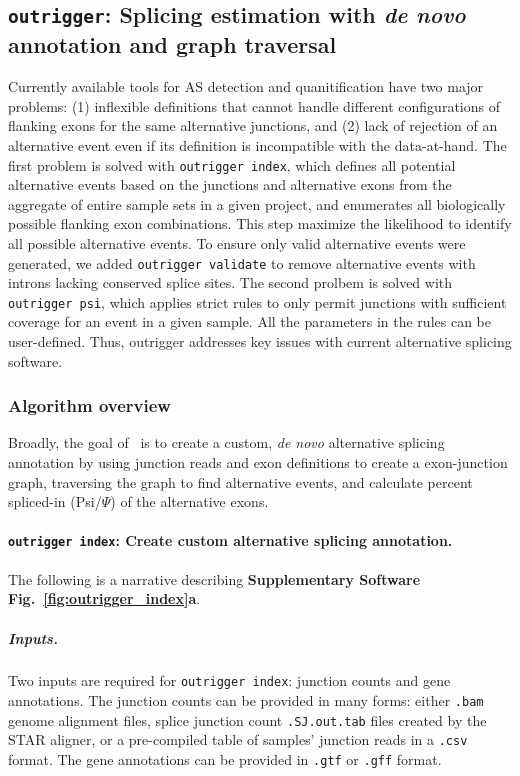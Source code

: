 \subsection{\texttt{outrigger}: Splicing estimation with \emph{de novo} annotation and graph traversal}
\label{sec:outrigger}

Currently available tools for AS detection and quanitification have two major problems: (1) inflexible definitions that cannot handle different configurations of flanking exons for the same alternative junctions, and (2) lack of rejection of an alternative event even if its definition is incompatible with the data-at-hand. The first problem is solved with \texttt{outrigger index}, which defines all potential alternative events based on the junctions and alternative exons from the aggregate of entire sample sets in a given project, and enumerates all biologically possible flanking exon combinations. This step maximize the likelihood to identify all possible alternative events. To ensure only valid alternative events were generated, we added \texttt{outrigger validate} to remove alternative events with introns lacking conserved splice sites. The second prolbem is solved with \texttt{outrigger psi}, which applies strict rules to only permit junctions with sufficient coverage for an event in a given sample. All the parameters in the rules can be user-defined. Thus, outrigger addresses key issues with current alternative splicing software.

\subsubsection{Algorithm overview}




Broadly, the goal of \outrigger\, is to create a custom, \emph{de novo} alternative splicing annotation by using junction reads and exon definitions to create a exon-junction graph, traversing the graph to find alternative events, and calculate percent spliced-in (Psi/$\Psi$) of the alternative exons.

\paragraph{\texttt{outrigger index}: Create custom alternative splicing annotation.} The following is a narrative describing \textbf{Supplementary Software Fig.~\ref{fig:outrigger_index}a}.

\subparagraph{Inputs.} Two inputs are required for \texttt{outrigger index}: junction counts and gene annotations. The junction counts can be provided in many forms: either \texttt{.bam} \cite{Group:OEYDIUUE} genome alignment files, splice junction count \texttt{.SJ.out.tab} files created by the STAR aligner\cite{Dobin:2013fg}, or a pre-compiled table of samples' junction reads in a \texttt{.csv} format. The gene annotations can be provided in \texttt{.gtf} or \texttt{.gff} format.

